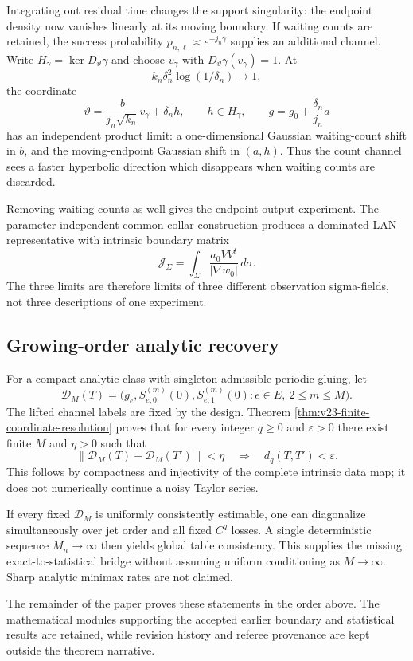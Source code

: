 Integrating out residual time changes the support singularity: the endpoint
density now vanishes linearly at its moving boundary.  If waiting counts are
retained, the success probability
\(p_{n,\ell}\asymp e^{-j_n\gamma}\) supplies an additional channel.  Write
\(H_\gamma=\ker D_\vartheta\gamma\) and choose
\(v_\gamma\) with \(D_\vartheta\gamma(v_\gamma)=1\).  At
\[
 k_n\delta_n^2\log(1/\delta_n)\to1,
\]
the coordinate
\[
 \vartheta=\frac{b}{j_n\sqrt{k_n}}v_\gamma+\delta_nh,
 \qquad h\in H_\gamma,
 \qquad
 g=g_0+\frac{\delta_n}{j_n}a
\]
has an independent product limit: a one-dimensional Gaussian waiting-count
shift in \(b\), and the moving-endpoint Gaussian shift in \((a,h)\).  Thus the
count channel sees a faster hyperbolic direction which disappears when waiting
counts are discarded.

Removing waiting counts as well gives the endpoint-output experiment.  The
parameter-independent common-collar construction produces a dominated LAN
representative with intrinsic boundary matrix
\begin{equation}\label{eq:intro-v23-boundary-info}
 \mathcal J_\Sigma=
 \int_\Sigma\frac{a_0VV^t}{|\nabla w_0|}\,d\sigma.
\end{equation}
The three limits are therefore limits of three different observation
sigma-fields, not three descriptions of one experiment.

\subsection{Growing-order analytic recovery}

For a compact analytic class with singleton admissible periodic gluing, let
\[
 \mathcal D_M(T)=
 \bigl(g_e,S_{e,0}^{(m)}(0),S_{e,1}^{(m)}(0):
           e\in E,\ 2\le m\le M\bigr).
\]
The lifted channel labels are fixed by the design.  Theorem
\ref{thm:v23-finite-coordinate-resolution} proves that for every integer
\(q\ge0\) and \(\varepsilon>0\) there exist finite \(M\) and \(\eta>0\) such
that
\[
 \|\mathcal D_M(T)-\mathcal D_M(T')\|<\eta
 \quad\Longrightarrow\quad
 d_q(T,T')<\varepsilon.
\]
This follows by compactness and injectivity of the complete intrinsic data map;
it does not numerically continue a noisy Taylor series.

If every fixed \(\mathcal D_M\) is uniformly consistently estimable, one can
diagonalize simultaneously over jet order and all fixed \(C^q\) losses.  A
single deterministic sequence \(M_n\to\infty\) then yields global table
consistency.  This supplies the missing exact-to-statistical bridge without
assuming uniform conditioning as \(M\to\infty\).  Sharp analytic minimax rates
are not claimed.

The remainder of the paper proves these statements in the order above.  The
mathematical modules supporting the accepted earlier boundary and statistical
results are retained, while revision history and referee provenance are kept
outside the theorem narrative.
